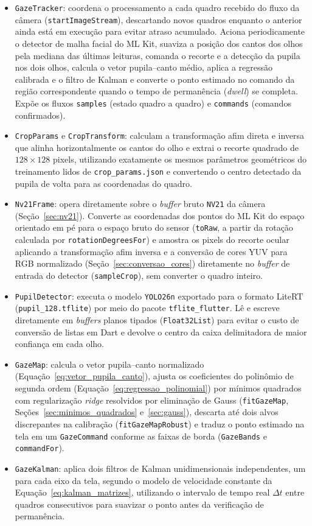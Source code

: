 \begin{itemize}
    \item \texttt{GazeTracker}: coordena o processamento a cada quadro recebido do fluxo da câmera (\texttt{startImageStream}), descartando novos quadros enquanto o anterior ainda está em execução para evitar atraso acumulado. Aciona periodicamente o detector de malha facial do ML Kit, suaviza a posição dos cantos dos olhos pela mediana das últimas leituras, comanda o recorte e a detecção da pupila nos dois olhos, calcula o vetor pupila--canto médio, aplica a regressão calibrada e o filtro de Kalman e converte o ponto estimado no comando da região correspondente quando o tempo de permanência (\textit{dwell}) se completa. Expõe os fluxos \texttt{samples} (estado quadro a quadro) e \texttt{commands} (comandos confirmados).
    \item \texttt{CropParams} e \texttt{CropTransform}: calculam a transformação afim direta e inversa que alinha horizontalmente os cantos do olho e extrai o recorte quadrado de $128 \times 128$ pixels, utilizando exatamente os mesmos parâmetros geométricos do treinamento lidos de \texttt{crop\_params.json} e convertendo o centro detectado da pupila de volta para as coordenadas do quadro.
    \item \texttt{Nv21Frame}: opera diretamente sobre o \textit{buffer} bruto \texttt{NV21} da câmera (Seção~\ref{sec:nv21}). Converte as coordenadas dos pontos do ML Kit do espaço orientado em pé para o espaço bruto do sensor (\texttt{toRaw}, a partir da rotação calculada por \texttt{rotationDegreesFor}) e amostra os pixels do recorte ocular aplicando a transformação afim inversa e a conversão de cores YUV para RGB normalizado (Seção~\ref{sec:conversao_cores}) diretamente no \textit{buffer} de entrada do detector (\texttt{sampleCrop}), sem converter o quadro inteiro.
    \item \texttt{PupilDetector}: executa o modelo \texttt{YOLO26n} exportado para o formato LiteRT (\texttt{pupil\_\allowbreak 128.tflite}) por meio do pacote \texttt{tflite\_flutter}. Lê e escreve diretamente em \textit{buffers} planos tipados (\texttt{Float32List}) para evitar o custo de conversão de listas em Dart e devolve o centro da caixa delimitadora de maior confiança em cada olho.
    \item \texttt{GazeMap}: calcula o vetor pupila--canto normalizado (Equação~\ref{eq:vetor_pupila_canto}), ajusta os coeficientes do polinômio de segunda ordem (Equação~\ref{eq:regressao_polinomial}) por mínimos quadrados com regularização \textit{ridge} resolvidos por eliminação de Gauss (\texttt{fitGazeMap}, Seções~\ref{sec:minimos_quadrados} e~\ref{sec:gauss}), descarta até dois alvos discrepantes na calibração (\texttt{fitGazeMapRobust}) e traduz o ponto estimado na tela em um \texttt{GazeCommand} conforme as faixas de borda (\texttt{GazeBands} e \texttt{commandFor}).
    \item \texttt{GazeKalman}: aplica dois filtros de Kalman unidimensionais independentes, um para cada eixo da tela, segundo o modelo de velocidade constante da Equação~\ref{eq:kalman_matrizes}, utilizando o intervalo de tempo real $\Delta t$ entre quadros consecutivos para suavizar o ponto antes da verificação de permanência.
\end{itemize}

